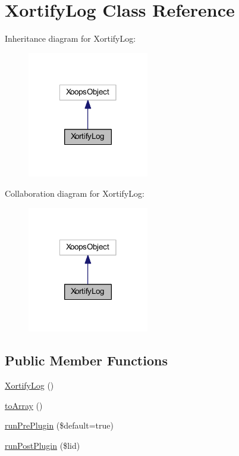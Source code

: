 \hypertarget{class_xortify_log}{\section{Xortify\-Log Class Reference}
\label{class_xortify_log}
}


Inheritance diagram for Xortify\-Log\-:
\nopagebreak
\begin{figure}[H]
\begin{center}
\leavevmode
\includegraphics[width=150pt]{class_xortify_log__inherit__graph}
\end{center}
\end{figure}


Collaboration diagram for Xortify\-Log\-:
\nopagebreak
\begin{figure}[H]
\begin{center}
\leavevmode
\includegraphics[width=150pt]{class_xortify_log__coll__graph}
\end{center}
\end{figure}
\subsection*{Public Member Functions}
\begin{DoxyCompactItemize}
\item 
\hyperlink{class_xortify_log_aac1a28175a1b29fd7e72c6d795297411}{Xortify\-Log} ()
\item 
\hyperlink{class_xortify_log_a658defb34762c8f40085aec87e16ba1a}{to\-Array} ()
\item 
\hyperlink{class_xortify_log_a3f189f6b1ffd23878681ca12bb91a486}{run\-Pre\-Plugin} (\$default=true)
\item 
\hyperlink{class_xortify_log_aa17aa62835f5fd61698b0b428c9932ac}{run\-Post\-Plugin} (\$lid)
\end{DoxyCompactItemize}


